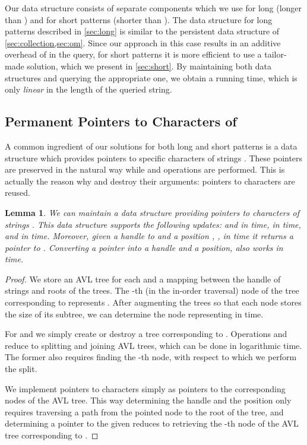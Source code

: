 \documentclass[a4paper]{article}
\newtheorem{lemma}[theorem]{Lemma}
\theoremstyle{remark}
\begin{document}
Our data structure consists of separate components which we use for long (longer than ) and for short patterns (shorter than ).
The data structure for long patterns described in \cref{sec:long} is similar to the persistent data structure of \cref{sec:collection,sec:om}.
Since our approach in this case results in an additive overhead of  in the query, for short patterns it is
more efficient to use a tailor-made solution, which we present in \cref{sec:short}.
By maintaining both data structures and querying the appropriate one, we obtain a running time, which is only \emph{linear} in the length of the queried string.

\newcommand{\lists}{\mathcal{L}}


\subsection{Permanent Pointers to Characters of }\label{sec:lists}
A common ingredient of our solutions for both long and short patterns is a data structure 
which provides pointers to specific characters of strings .
These pointers are preserved in the natural way while  and  operations are performed.
This is actually the reason why  and  destroy their arguments: pointers to characters
are reused.

\begin{lemma}\label{lem:lists}
We can maintain a data structure  providing pointers to characters of strings .
This data structure supports the following updates:  and  in  time,
 in  time, and  in  time.
Moreover, given a handle to  and a position , , in  time it returns
a pointer to . Converting a pointer into a handle and a position, also works in  time.
\end{lemma}
\begin{proof}
We store an AVL tree for each  and a mapping between the handle of strings  and roots of the trees. The -th (in the in-order traversal) node of the tree corresponding to 
represents . After augmenting the trees so that each node stores the size of its subtree, we
can determine the node representing  in  time.

For  and  we simply create or destroy a tree corresponding to .
Operations  and  reduce to splitting and joining AVL trees, which can be done in logarithmic time.
The former also requires finding the -th node, with respect to which we perform the split.

We implement pointers to characters simply as pointers to the corresponding nodes of the AVL tree.
This way determining the handle and the position only requires traversing a path from the pointed node to the root of the tree,
and determining a pointer to the given  reduces to retrieving the -th node of the AVL tree
corresponding to .
\end{proof}
\end{document}

